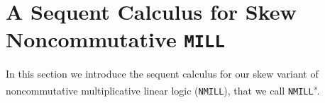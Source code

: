 \documentclass[submission,copyright,creativecommons]{eptcs}
\theoremstyle{definition}
\newcommand{\MILL}{\texttt{MILL}}
\newcommand{\NMILL}{\texttt{NMILL}}
\newcommand{\SkNMILL}{\NMILL\textsuperscript{\textit{s}}}
\begin{document}

\section{A Sequent Calculus for Skew Noncommutative \MILL}\label{sec2}
In this section we introduce the sequent calculus for our skew variant of noncommutative multiplicative linear logic (\NMILL), that we call \SkNMILL.
\end{document}
